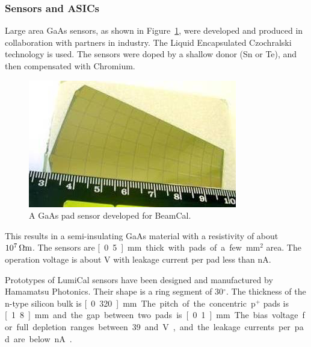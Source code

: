 \subsubsection{Sensors and ASICs}
Large area GaAs sensors, as shown in Figure~\ref{fig:GaAs}, were developed
and produced in collaboration with partners in industry. The Liquid Encapsulated
Czochralski technology is used. The sensors were
doped by a shallow donor (Sn or Te),
and then compensated  with Chromium.
\begin{figure}[hbp]
\begin{center}
    \includegraphics[width=0.8\columnwidth]{Calorimeter/FCAL/figs/GaAs_sensor_new.jpg}
  \end{center}
          \caption{A GaAs pad sensor developed for BeamCal.}
    \label{fig:GaAs}
\end{figure}
This results in a semi-insulating GaAs material with a resistivity of about $\unit[10^7]{\Omega m}$.
The sensors are \unit[0.5]{mm} thick with pads of a few mm$^2$ area. The operation voltage is about \unit[100]{V} with
leakage current per pad less than \unit[500]{nA}.

Prototypes of LumiCal sensors have been designed
and manufactured by Hamamatsu
Photonics.
Their shape is a ring segment of 30$^\circ$.
The thickness of the n-type silicon bulk is \unit[0.320]{mm}.
The pitch of the concentric p$^+$ pads is \unit[1.8]{mm} and
the gap between two pads is \unit[0.1]{mm}.
The bias voltage for full depletion ranges between 39 and \unit[45]{V},
and the leakage currents per pad are below \unit[5]{nA}~\cite{eudet2009}.

